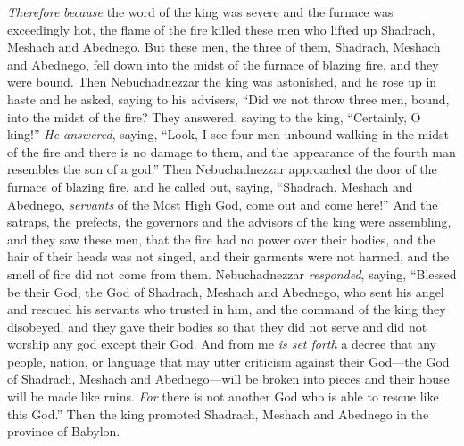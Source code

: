 \begin{biblechapter}
\verse \textit{Therefore} \textit{because} the word of the king was severe and the furnace was exceedingly hot, the flame of the fire killed these men who lifted up Shadrach, Meshach and Abednego.
\verse But these men, the three of them, Shadrach, Meshach and Abednego, fell down into the midst of the furnace of blazing fire, and they were bound.
\verse Then Nebuchadnezzar the king was astonished, and he rose up in haste and he asked, saying to his advisers, “Did we not throw three men, bound, into the midst of the fire? They answered, saying to the king, “Certainly, O king!”
\verse \textit{He answered}, saying, “Look, I see four men unbound walking in the midst of the fire and there is no damage to them, and the appearance of the fourth man resembles the son of a god.”
\verse Then Nebuchadnezzar approached the door of the furnace of blazing fire, and he called out, saying, “Shadrach, Meshach and Abednego, \textit{servants} of the Most High God, come out and come here!”
\verse And the satraps, the prefects, the governors and the advisors of the king were assembling, and they saw these men, that the fire had no power over their bodies, and the hair of their heads was not singed, and their garments were not harmed, and the smell of fire did not come from them.
 Nebuchadnezzar \textit{responded}, saying, “Blessed be their God, the God of Shadrach, Meshach and Abednego, who sent his angel and rescued his servants who trusted in him, and the command of the king they disobeyed, and they gave their bodies so that they did not serve and did not worship any god except their God.
\verse And from me \textit{is set forth} a decree that any people, nation, or language that may utter criticism against their God—the God of Shadrach, Meshach and Abednego—will be broken into pieces and their house will be made like ruins. \textit{For} there is not another God who is able to rescue like this God.”
\verse Then the king promoted Shadrach, Meshach and Abednego in the province of Babylon.
\end{biblechapter}


